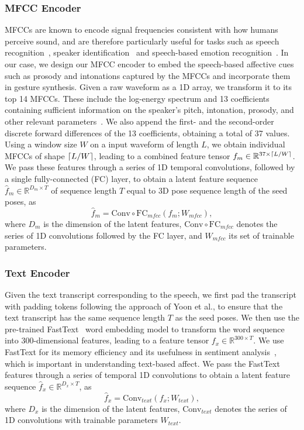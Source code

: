 \documentclass[conference,compsoc]{IEEEtran}
\theoremstyle{definition}
\newcommand{\parens}[1]{\left(#1\right)}
\DeclarePairedDelimiter{\ceil}{\lceil}{\rceil}
\begin{document}
\subsubsection{MFCC Encoder}\label{subsubsec:mfcc_encoder}
MFCCs are known to encode signal frequencies consistent with how humans perceive sound, and are therefore particularly useful for tasks such as speech recognition~\cite{mfcc_speech_recognition}, speaker identification~\cite{mfcc_speaker_identification} and speech-based emotion recognition~\cite{mfcc_ser}. In our case, we design our MFCC encoder to embed the speech-based affective cues such as prosody and intonations captured by the MFCCs and incorporate them in gesture synthesis. Given a raw waveform as a 1D array, we transform it to its top 14 MFCCs. These include the log-energy spectrum and 13 coefficients containing sufficient information on the speaker's pitch, intonation, prosody, and other relevant parameters~\cite{cmu_mosei,obamanet}. We also append the first- and the second-order discrete forward differences of the 13 coefficients, obtaining a total of 37 values. Using a window size $W$ on a input waveform of length $L$, we obtain individual MFCCs of shape $\ceil*{L/W}$, leading to a combined feature tensor $f_m \in \mathbb{R}^{37 \times \ceil*{L/W}}$. We pass these features through a series of 1D temporal convolutions, followed by a single fully-connected (FC) layer, to obtain a latent feature sequence $\hat{f}_m \in \mathbb{R}^{D_m \times T}$ of sequence length $T$ equal to 3D pose sequence length of the seed poses, as
\begin{equation}
    \hat{f}_m = \textrm{Conv}\circ\textrm{FC}_{mfcc}\parens{f_m; W_{mfcc}},
\end{equation}
where $D_m$ is the dimension of the latent features, $\textrm{Conv}\circ\textrm{FC}_{mfcc}$ denotes the series of 1D convolutions followed by the FC layer, and $W_{mfcc}$ its set of trainable parameters.

\subsubsection{Text Encoder}\label{subsubsec:text_encoder}
Given the text transcript corresponding to the speech, we first pad the transcript with padding tokens following the approach of Yoon et al., to ensure that the text transcript has the same sequence length $T$ as the seed poses. We then use the pre-trained FastText~\cite{fasttext} word embedding model to transform the word sequence into 300-dimensional features, leading to a feature tensor $f_x \in \mathbb{R}^{300 \times T}$. We use FastText for its memory efficiency and its usefulness in sentiment analysis~\cite{fasttext_sentiment_analysis}, which is important in understanding text-based affect. We pass the FastText features through a series of temporal 1D convolutions to obtain a latent feature sequence $\hat{f}_x \in \mathbb{R}^{D_x \times T}$, as
\begin{equation}
    \hat{f}_x = \textrm{Conv}_{text}\parens{f_x; W_{text}},
\end{equation}
where $D_x$ is the dimension of the latent features, $\textrm{Conv}_{text}$ denotes the series of 1D convolutions with trainable parameters $W_{text}$.
\end{document}
